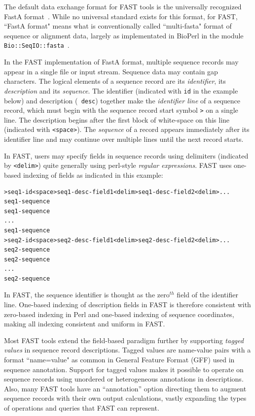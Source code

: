 \documentclass{frontiersSCNS} %
\begin{document}
The default data exchange format for FAST tools is the universally
recognized FastA format~\citep{lipman1985rapid}. While no universal
standard exists for this format, for FAST, ``FastA format" means what
is conventionally called ``multi-fasta" format of sequence or alignment
data, largely as implementated in BioPerl in the module {\tt
  Bio::SeqIO::fasta}~\citep{Stajich2002}.

In the FAST implementation of FastA format, multiple sequence records
may appear in a single file or input stream. Sequence data may contain
gap characters. The logical elements of a sequence record are its {\it
  identifier}, its {\it description} and its {\it sequence}. The identifier
(indicated with {\tt id} in the example below) and description ({\tt
  desc}) together make the {\it identifier line} of a sequence record,
which must begin with the sequence record start symbol {\tt >} on a
single line. The description begins after the first block of
white-space on this line (indicated with {\tt <space>}). The {\it
  sequence} of a record appears immediately after its identifier line
and may continue over multiple lines until the next record starts.

In FAST, users may specify fields in sequence records using delimiters
(indicated by {\tt <delim>}) quite generally using perl-style
{\it regular expressions}. FAST uses one-based indexing of fields as
indicated in this example:

\begin{verbatim}
>seq1-id<space>seq1-desc-field1<delim>seq1-desc-field2<delim>...
seq1-sequence
seq1-sequence
...
seq1-sequence
>seq2-id<space>seq2-desc-field1<delim>seq2-desc-field2<delim>...
seq2-sequence
seq2-sequence
...
seq2-sequence
\end{verbatim}

In FAST, the sequence identifier is thought as the zero$^{th}$ field
of the identifier line. One-based indexing of description fields in
FAST is therefore consistent with zero-based indexing in Perl and
one-based indexing of sequence coordinates, making all indexing
consistent and uniform in FAST.

Most FAST tools extend the field-based paradigm further by supporting
{\it tagged values} in sequence record descriptions. Tagged values are
name-value pairs with a format ``name=value" as common in General
Feature Format (GFF) used in sequence annotation. Support for tagged
values makes it possible to operate on sequence records using
unordered or heterogeneous annotations in descriptions.  Also, many
FAST tools have an ``annotation'' option directing them to augment
sequence records with their own output calculations, vastly expanding
the types of operations and queries that FAST can represent.
\end{document}
